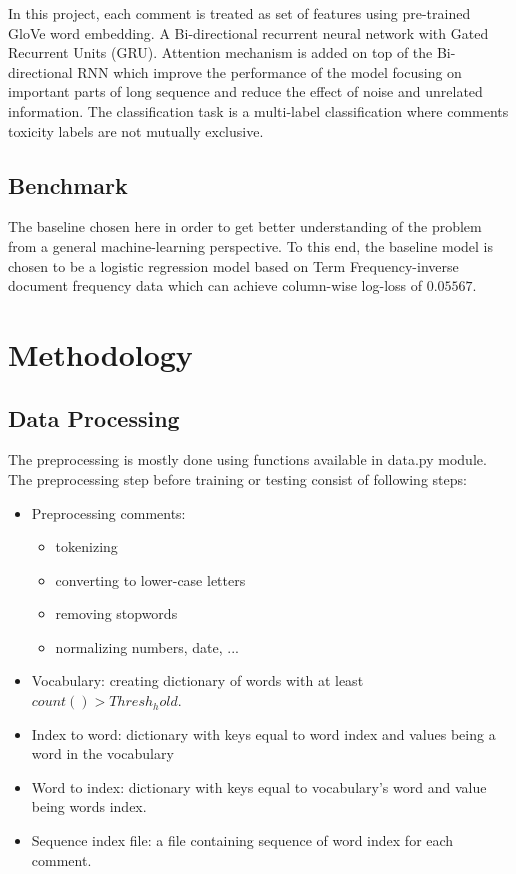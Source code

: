 \documentclass{article}
\begin{document}
    In this project, each comment is treated as set of features using pre-trained GloVe word embedding. A Bi-directional recurrent neural network with Gated Recurrent Units (GRU). Attention mechanism is added on top of the Bi-directional RNN which improve the performance of the model focusing on important parts of long sequence and reduce the effect of noise and unrelated information. The classification task is a multi-label classification where comments toxicity labels are not mutually exclusive.



    \subsection{Benchmark}

    The baseline chosen here in order to get better understanding of the problem from a general machine-learning perspective. To this end, the baseline model is chosen to be a logistic regression model based on Term Frequency-inverse document frequency data which can achieve column-wise log-loss of $0.05567$.



\section{Methodology}

    \subsection{Data Processing}

    The preprocessing is mostly done using functions available in data.py module. The preprocessing step  before training or testing consist of following steps:

    \begin{itemize}
        \item Preprocessing comments:
            \begin{itemize}
                \item tokenizing
                \item converting to lower-case letters
                \item removing stopwords
                \item normalizing numbers, date, ...
            \end{itemize}

        \item Vocabulary: creating dictionary of words with at least $count() > Thresh_hold$.
        \item Index to word: dictionary with keys equal to word index and values being a word in the vocabulary
        \item Word to index: dictionary with keys equal to vocabulary's word and value being words index.
        \item Sequence index file: a file containing sequence of word index for each comment.
    \end{itemize}
\end{document}
